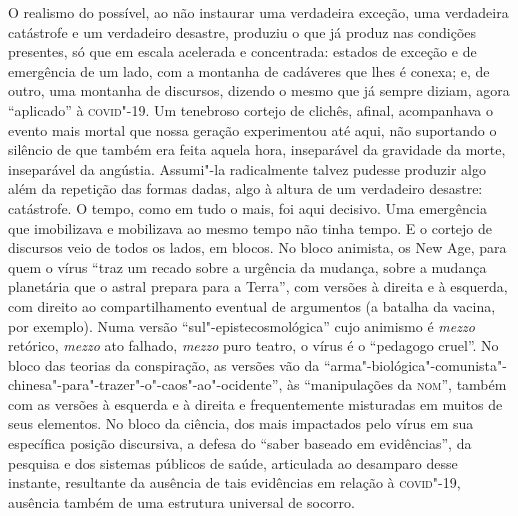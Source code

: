 O realismo do possível, ao não instaurar uma verdadeira exceção, uma
verdadeira catástrofe e um verdadeiro desastre, produziu o que já produz
nas condições presentes, só que em escala acelerada e concentrada:
estados de exceção e de emergência de um lado, com a montanha de
cadáveres que lhes é conexa; e, de outro, uma montanha de discursos,
dizendo o mesmo que já sempre diziam, agora ``aplicado'' à \textsc{covid}"-19. Um
tenebroso cortejo de clichês, afinal, acompanhava o evento mais mortal
que nossa geração experimentou até aqui, não suportando o silêncio de
que também era feita aquela hora, inseparável da gravidade da morte,
inseparável da angústia. Assumi"-la radicalmente talvez pudesse produzir
algo além da repetição das formas dadas, algo à altura de um verdadeiro
desastre: catástrofe. O tempo, como em tudo o mais, foi aqui decisivo.
Uma emergência que imobilizava e mobilizava ao mesmo tempo não tinha
tempo. E o cortejo de discursos veio de todos os lados, em blocos. No
bloco animista, os New Age, para quem o vírus ``traz um recado sobre a
urgência da mudança, sobre a mudança planetária que o astral prepara
para a Terra'', com versões à direita e à esquerda, com direito ao
compartilhamento eventual de argumentos (a batalha da vacina, por
exemplo). Numa versão ``sul"-epistecosmológica'' cujo animismo é
\emph{mezzo} retórico, \emph{mezzo} ato falhado, \emph{mezzo} puro
teatro, o vírus é o ``pedagogo cruel''. No bloco das teorias da
conspiração, as versões vão da
``arma"-biológica"-comunista"-chinesa"-para"-trazer"-o"-caos"-ao"-ocidente'', às
``manipulações da \textsc{nom}'', também com as versões à esquerda e à direita e
frequentemente misturadas em muitos de seus elementos. No bloco da
ciência, dos mais impactados pelo vírus em sua específica posição
discursiva, a defesa do ``saber baseado em evidências'', da pesquisa e
dos sistemas públicos de saúde, articulada ao desamparo desse instante,
resultante da ausência de tais evidências em relação à \textsc{covid}"-19,
ausência também de uma estrutura universal de socorro.

